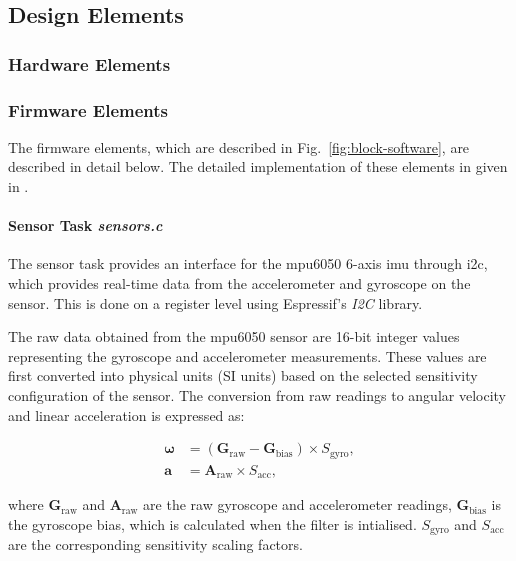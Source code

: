 
\subsection{Design Elements}
\label{sec:design-elements}

\subsubsection{Hardware Elements}

\subsubsection{Firmware Elements}

The firmware elements, which are described in Fig.~\ref{fig:block-software}, are described in detail below. The detailed implementation of these elements in given in \cite{flightcontroller_git}.

\paragraph{\textbf{Sensor Task} \textit{sensors.c}} \leavevmode

The sensor task provides an interface for the \gls{mpu6050} 6-axis \gls{imu} through \gls{i2c}, which provides real-time data from the accelerometer and gyroscope on the sensor. This is done on a register level using Espressif's \textit{I2C} library.

The raw data obtained from the \gls{mpu6050} sensor are 16-bit integer values representing the gyroscope and accelerometer measurements. These values are first converted into physical units (SI units) based on the selected sensitivity configuration of the sensor. The conversion from raw readings to angular velocity and linear acceleration is expressed as:

\begin{align}
\boldsymbol{\omega} &= (\mathbf{G}_{\text{raw}} - \mathbf{G}_{\text{bias}}) \times S_{\text{gyro}}, \\[6pt]
\mathbf{a} &= \mathbf{A}_{\text{raw}} \times S_{\text{acc}},
\end{align}

where \( \mathbf{G}_{\text{raw}} \) and \( \mathbf{A}_{\text{raw}} \) are the raw gyroscope and accelerometer readings, 
\( \mathbf{G}_{\text{bias}} \) is the gyroscope bias, which is calculated when the filter is intialised. \( S_{\text{gyro}} \) and \( S_{\text{acc}} \) are the corresponding sensitivity scaling factors.

